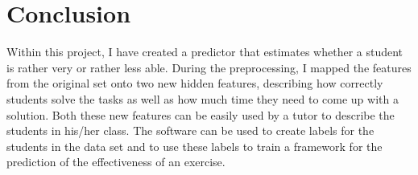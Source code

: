 \section{Conclusion}
Within this project, I have created a predictor that estimates whether a student is rather very or rather less able. During the preprocessing, I mapped the features from the original set onto two new hidden features, describing how correctly students solve the tasks as well as how much time they need to come up with a solution. Both these new features can be easily used by a tutor to describe the students in his/her class. The software can be used to create labels for the students in the data set and to use these labels to train a framework for the prediction of the effectiveness of an exercise.  